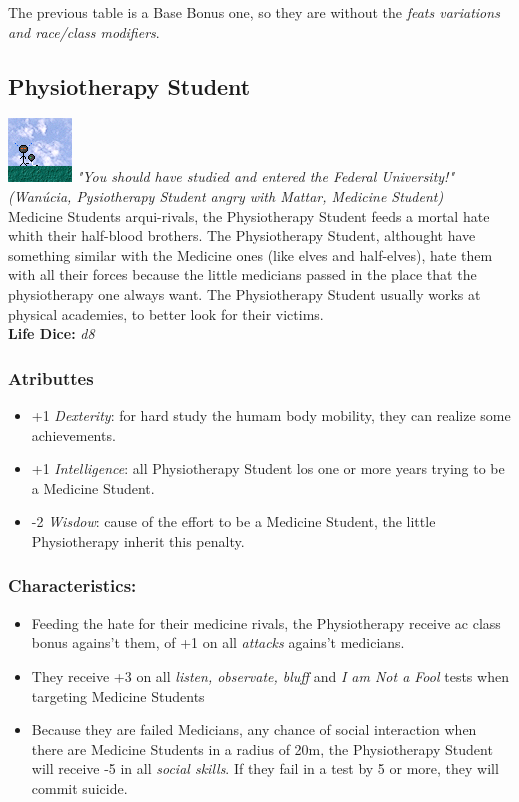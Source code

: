 \documentclass[ letterpaper,12pt]{article}
\begin{document}
The previous table is a Base Bonus one, so they are without the {\it feats variations and race/class modifiers}.\\

\subsection{Physiotherapy Student}
\includegraphics{../data/classes/Img/fisioterapia.png}
{\it "You should have studied and entered the Federal University!"\\
     (Wanúcia, Pysiotherapy Student angry with Mattar, Medicine Student)}\\

Medicine Students arqui-rivals, the Physiotherapy Student feeds a mortal hate whith their half-blood brothers. The Physiotherapy Student, althought have something similar with the Medicine ones (like elves and half-elves), hate them with all their forces because the little medicians passed in the place that the physiotherapy one always want. The Physiotherapy Student usually works at physical academies, to better look for their victims.\\

{\bf Life Dice:} {\it d8}

\subsubsection{Atributtes}
\begin{itemize}
\item{+1 {\it Dexterity}: for hard study the humam body mobility, they can realize some achievements.}
\item{+1 {\it Intelligence}: all Physiotherapy Student los one or more years trying to be a Medicine Student.}
\item{-2 {\it Wisdow}: cause of the effort to be a Medicine Student, the little Physiotherapy inherit this penalty.}
\end{itemize}

\subsubsection{Characteristics:}
\begin{itemize}
\item{Feeding the hate for their medicine rivals, the Physiotherapy receive  ac class bonus agains't them, of +1 on all {\it attacks} agains't medicians.}
\item{They receive +3 on all {\it listen, observate, bluff} and {\it I am Not a Fool} tests when targeting Medicine Students}
\item{Because they are failed Medicians, any chance of social interaction when there are Medicine Students in a radius of 20m, the Physiotherapy Student will receive -5 in all {\it social skills}. If they fail in a test by 5 or more, they will commit suicide.}
\end{itemize}
\end{document}
